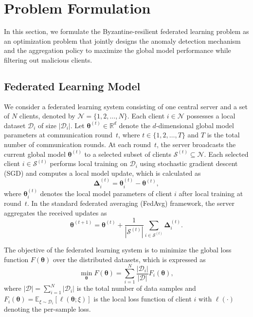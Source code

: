 \section{Problem Formulation}\label{sec:problem_formulation}

In this section, we formulate the Byzantine-resilient federated learning problem as an optimization problem that jointly designs the anomaly detection mechanism and the aggregation policy to maximize the global model performance while filtering out malicious clients.

\subsection{Federated Learning Model}

We consider a federated learning system consisting of one central server and a set of $N$ clients, denoted by $\mathcal{N} = \{1, 2, \ldots, N\}$. Each client $i \in \mathcal{N}$ possesses a local dataset $\mathcal{D}_i$ of size $|\mathcal{D}_i|$. Let $\boldsymbol{\theta}^{(t)} \in \mathbb{R}^d$ denote the $d$-dimensional global model parameters at communication round~$t$, where $t \in \{1, 2, \ldots, T\}$ and $T$ is the total number of communication rounds. At each round~$t$, the server broadcasts the current global model $\boldsymbol{\theta}^{(t)}$ to a selected subset of clients $\mathcal{S}^{(t)} \subseteq \mathcal{N}$. Each selected client $i \in \mathcal{S}^{(t)}$ performs local training on $\mathcal{D}_i$ using stochastic gradient descent (SGD) and computes a local model update, which is calculated as
\begin{equation}\label{eq:local_update}
    \boldsymbol{\Delta}_i^{(t)} = \boldsymbol{\theta}_i^{(t)} - \boldsymbol{\theta}^{(t)},
\end{equation}
where $\boldsymbol{\theta}_i^{(t)}$ denotes the local model parameters of client $i$ after local training at round~$t$. In the standard federated averaging (FedAvg) framework, the server aggregates the received updates as
\begin{equation}\label{eq:fedavg}
    \boldsymbol{\theta}^{(t+1)} = \boldsymbol{\theta}^{(t)} + \frac{1}{|\mathcal{S}^{(t)}|} \sum_{i \in \mathcal{S}^{(t)}} \boldsymbol{\Delta}_i^{(t)}.
\end{equation}

The objective of the federated learning system is to minimize the global loss function $F(\boldsymbol{\theta})$ over the distributed datasets, which is expressed as
\begin{equation}\label{eq:global_loss}
    \min_{\boldsymbol{\theta}} F(\boldsymbol{\theta}) = \sum_{i=1}^{N} \frac{|\mathcal{D}_i|}{|\mathcal{D}|} F_i(\boldsymbol{\theta}),
\end{equation}
where $|\mathcal{D}| = \sum_{i=1}^{N} |\mathcal{D}_i|$ is the total number of data samples and $F_i(\boldsymbol{\theta}) = \mathbb{E}_{\xi \sim \mathcal{D}_i}[\ell(\boldsymbol{\theta}; \xi)]$ is the local loss function of client $i$ with $\ell(\cdot)$ denoting the per-sample loss.

